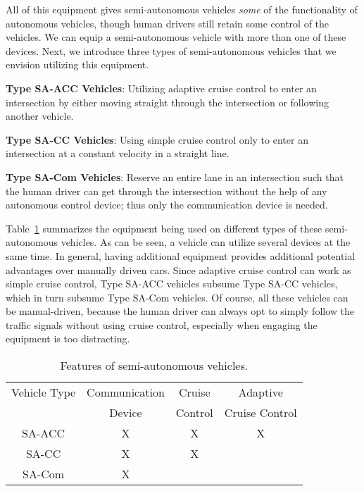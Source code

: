 All of this equipment gives semi-autonomous vehicles \emph{some} of
the functionality of autonomous vehicles, though human drivers still
retain some control of the vehicles.  We can equip a semi-autonomous
vehicle with more than one of these devices.  Next, we introduce three
types of semi-autonomous vehicles that we envision utilizing this
equipment.

\begin{small_ind_s_itemize}
\item \textbf{Type SA-ACC Vehicles}: Utilizing adaptive cruise
control to enter an intersection by either moving straight through the
intersection or following another vehicle.
\item \textbf{Type SA-CC Vehicles}: Using simple cruise control only
to enter an intersection at a constant velocity in a straight line.
\item \textbf{Type SA-Com Vehicles}: Reserve an entire lane in an
intersection such that the human driver can get through the
intersection without the help of any autonomous control device; thus
only the communication device is needed.
\end{small_ind_s_itemize}

Table~\ref{table:type} summarizes the equipment being used on
different types of these semi-autonomous vehicles.  As can be seen, a
vehicle can utilize several devices at the same time.  In general,
having additional equipment provides additional potential advantages
over manually driven cars.  Since adaptive cruise control can work as
simple cruise control, Type SA-ACC vehicles subsume Type SA-CC
vehicles, which in turn subsume Type SA-Com vehicles.  Of course, all
these vehicles can be manual-driven, because the human driver can
always opt to simply follow the traffic signals without using cruise
control, especially when engaging the equipment is too distracting.


\begin{table}
\centering
\caption{Features of semi-autonomous vehicles.}
\label{table:type}
\small
\begin{tabular}{|c|c|c|c|}
  \hline
  Vehicle Type & Communication & Cruise & Adaptive \\
               & Device & Control & Cruise Control \\
  \hline
  SA-ACC & X & X & X  \\
  \hline
  SA-CC & X & X &  \\
  \hline
  SA-Com & X & &  \\
  \hline
\end{tabular}
\vspace{-.25in}
\end{table}

